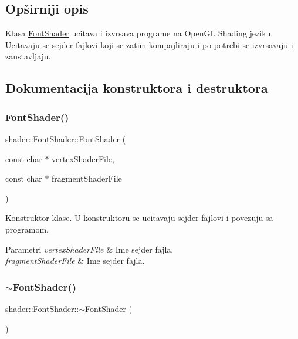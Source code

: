 \subsection{Opširniji opis}
Klasa \hyperlink{classshader_1_1FontShader}{Font\+Shader} ucitava i izvrsava programe na Open\+GL Shading jeziku. Ucitavaju se sejder fajlovi koji se zatim kompajliraju i po potrebi se izvrsavaju i zaustavljaju. 

\subsection{Dokumentacija konstruktora i destruktora}
\mbox{\label{classshader_1_1FontShader_ab4e52a49071555c4abaaf0c19aa7892f}} 
\subsubsection{\texorpdfstring{Font\+Shader()}{FontShader()}}
{\footnotesize\ttfamily shader\+::\+Font\+Shader\+::\+Font\+Shader (\begin{DoxyParamCaption}\item[{const char $\ast$}]{vertex\+Shader\+File,  }\item[{const char $\ast$}]{fragment\+Shader\+File }\end{DoxyParamCaption})}



Konstruktor klase. U konstruktoru se ucitavaju sejder fajlovi i povezuju sa programom. 


\begin{DoxyParams}{Parametri}
{\em vertex\+Shader\+File} & Ime sejder fajla. \\
\hline
{\em fragment\+Shader\+File} & Ime sejder fajla. \\
\hline
\end{DoxyParams}
\mbox{\label{classshader_1_1FontShader_ad74a8facae98d230f10f3727a539be90}} 
\subsubsection{\texorpdfstring{$\sim$\+Font\+Shader()}{~FontShader()}}
{\footnotesize\ttfamily shader\+::\+Font\+Shader\+::$\sim$\+Font\+Shader (\begin{DoxyParamCaption}{ }\end{DoxyParamCaption})}



